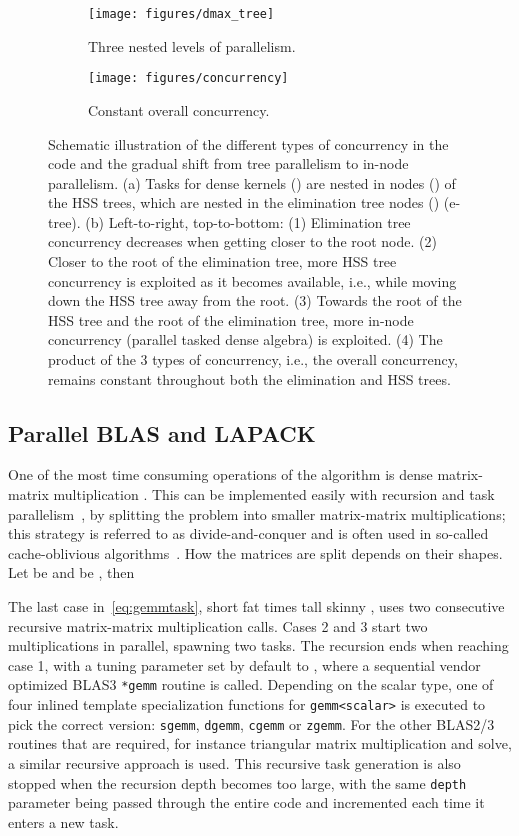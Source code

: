 \documentclass{article}
\begin{document}
\begin{figure}
  \begin{subfigure}[b]{.49\textwidth}
    \texttt{[image: figures/dmax\_tree]}
    \vspace{.2cm}
    \caption{Three nested levels of parallelism.}
    \label{fig:dmax_tree}
  \end{subfigure}
  \begin{subfigure}[b]{.49\textwidth}
    \centering
    \texttt{[image: figures/concurrency]}
    \caption{Constant overall concurrency.}
    \label{fig:concurrency}
  \end{subfigure}
  \caption{\footnotesize Schematic illustration of the different types
    of concurrency in the code and the gradual shift from tree
    parallelism to in-node parallelism. (a) Tasks for dense kernels
    () are nested in nodes () of the HSS trees, which
    are nested in the elimination tree nodes () (e-tree). (b)
    Left-to-right, top-to-bottom: (1) Elimination tree concurrency
    decreases when getting closer to the root node. (2) Closer to the
    root of the elimination tree, more HSS tree concurrency is
    exploited as it becomes available, i.e., while moving down the HSS
    tree away from the root. (3) Towards the root of the HSS tree and
    the root of the elimination tree, more in-node concurrency
    (parallel tasked dense algebra) is exploited. (4) The product of
    the 3 types of concurrency, i.e., the overall concurrency, remains
    constant throughout both the elimination and HSS trees.}
  \label{fig:conc}
\end{figure}

\subsection{Parallel BLAS and LAPACK}
One of the most time consuming operations of the algorithm is dense
matrix-matrix multiplication . This can be
implemented easily with recursion and task
parallelism~\cite{mccool2012structured}, by splitting the problem into
smaller matrix-matrix multiplications; this strategy is referred to as
divide-and-conquer and is often used in so-called cache-oblivious
algorithms~\cite{frigo1999cache}. How the matrices are split depends
on their shapes. Let  be  and  be , then

The last case in~\eqref{eq:gemmtask}, short fat  times tall skinny
, uses two consecutive recursive matrix-matrix multiplication
calls. Cases 2 and 3 start two multiplications in parallel, spawning
two tasks. The recursion ends when reaching case 1, with  a tuning
parameter set by default to , where a sequential vendor
optimized BLAS3 \verb+*gemm+ routine is called. Depending on the
scalar type, one of four inlined template specialization functions for
\verb+gemm<scalar>+ is executed to pick the correct version:
\verb+sgemm+, \verb+dgemm+, \verb+cgemm+ or \verb+zgemm+. For the
other BLAS2/3 routines that are required, for instance triangular
matrix multiplication and solve, a similar recursive approach is
used. This recursive task generation is also stopped when the
recursion depth becomes too large, with the same \verb+depth+
parameter being passed through the entire code and incremented each
time it enters a new task.
\end{document}
